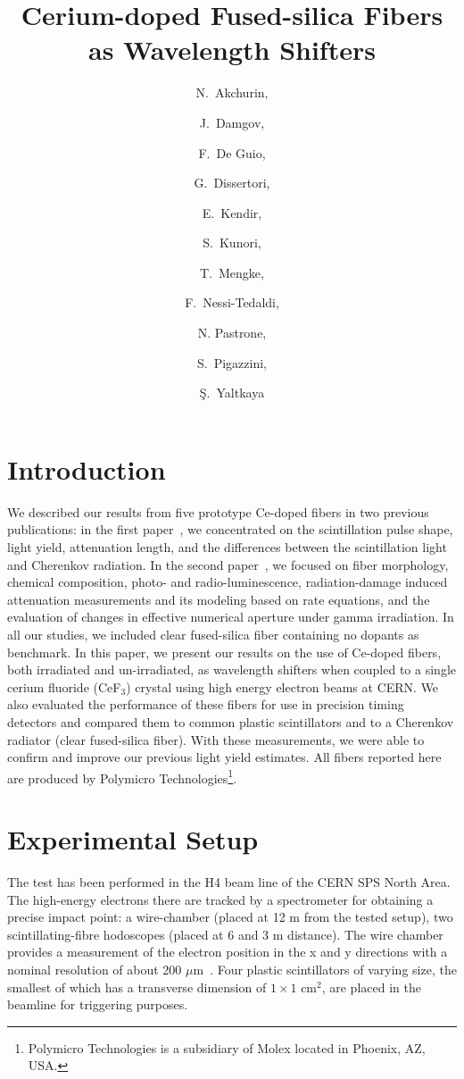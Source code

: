 \documentclass[a4paper,11pt]{article}
\title{\boldmath  Cerium-doped Fused-silica Fibers
as Wavelength Shifters}
\author[a,1]{N.~Akchurin,\note{Corresponding author.}}
\author[a]{J.~Damgov,}
\author[a]{F.~De Guio,}
\author[c]{G.~Dissertori,}
\author[b]{E.~Kendir,}
\author[a]{S.~Kunori,}
\author[a]{T.~Mengke,}
\author[c]{F.~Nessi-Tedaldi,}
\author[d]{N. Pastrone,}
\author[c]{S.~Pigazzini,}
\author[b]{\c{S}.~Yaltkaya}
\affiliation[a]{Texas Tech University, Department of Physics and Astronomy,  Lubbock, TX, 79409, USA}
\affiliation[b]{Akdeniz University, Department of Physics, Antalya, 07070, Turkey}
\affiliation[c]{ETH, Z\"urich, Switzerland}
\affiliation[d]{INFN-Torino, Italy}
\begin{document}
\maketitle
\flushbottom


\section{Introduction}
\label{sec:intro}
We described our results from five prototype Ce-doped fibers in two previous publications:  in the first paper~\cite{JINSTPaper}, we concentrated on the scintillation pulse shape, light yield, attenuation length, and the differences between the scintillation light and Cherenkov radiation.  In the second paper~\cite{JINSTPaper2}, we focused on fiber morphology, chemical composition, photo- and radio-luminescence, radiation-damage induced attenuation measurements and its modeling based on rate equations, and the evaluation of changes in effective numerical aperture under gamma irradiation.   In all our studies, we included clear fused-silica fiber containing no dopants  as benchmark. In this paper, we present our results on the use of Ce-doped fibers, both irradiated and un-irradiated, as wavelength shifters when coupled to a single cerium fluoride (CeF$_3$) crystal using high energy electron beams at CERN.  We also evaluated the performance of these fibers for use in precision timing detectors and compared them to common plastic scintillators and to a Cherenkov radiator (clear fused-silica fiber).  With these measurements, we were able to confirm and improve our previous light yield estimates.  All fibers reported here are produced by Polymicro Technologies\footnote{Polymicro Technologies is a subsidiary of Molex located in Phoenix, AZ, USA.}.

\section{Experimental Setup}
\label{sec:experimentalsetup}
The test has been performed in the H4 beam line of the CERN SPS North Area. The high-energy electrons there are tracked by a spectrometer for obtaining a precise impact point: a wire-chamber (placed at 12 m from the tested setup), two scintillating-fibre hodoscopes (placed at 6 and 3 m distance). The wire chamber provides a measurement of the electron position in the x and y directions with a nominal resolution of about 200 $\mu$m~\cite{r-SPA}.
Four plastic scintillators of varying size, the smallest of which has a transverse dimension of $1 \times 1$ cm$^2$, are placed in the beamline for triggering purposes.
\end{document}

